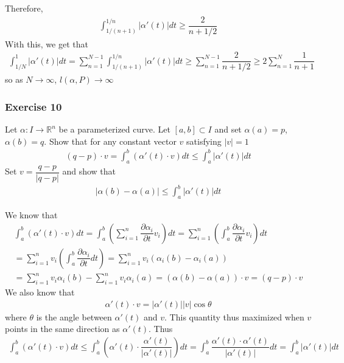 \documentclass{article}
\newcommand{\R}{\mathbb{R}}
\begin{document}
	Therefore,
	\begin{gather*}
		\int_{1/(n + 1)}^{1/n} |\alpha'(t)| dt \geq \dfrac{2}{n + 1/2}
	\end{gather*}
	With this, we get that
	\begin{gather*}
		\int_{1/N}^{1} |\alpha'(t)| dt = \sum_{n = 1}^{N - 1} \int_{1/(n + 1)}^{1/n} |\alpha'(t)| dt \geq \sum_{n = 1}^{N - 1} \dfrac{2}{n + 1/2} \geq 2 \sum_{n = 1}^{N} \dfrac{1}{n + 1}
	\end{gather*}
	so as $N \to \infty$, $l(\alpha, P) \to \infty$
	
	\subsubsection*{Exercise 10}
	Let $\alpha \colon I \to \R^n$ be a parameterized curve. Let $[a, b] \subset I$ and set $\alpha(a) = p$, $\alpha(b) = q$. Show that for any constant vector $v$ satisfying $|v| = 1$
	\begin{gather*}
		(q - p) \cdot v = \int_a^b (\alpha'(t) \cdot v) dt \leq \int_a^b |\alpha'(t)| dt
	\end{gather*}
	Set $v = \dfrac{q - p}{|q - p|}$ and show that
	\begin{gather*}
		|\alpha(b) - \alpha(a)| \leq \int_a^b |\alpha'(t)| dt
	\end{gather*}
	
	We know that
	\begin{gather*}
		\int_a^b ( \alpha'(t) \cdot v ) dt = \int_a^b \left( \sum_{i = 1}^{n} \dfrac{\partial \alpha_i}{\partial t} v_i \right) dt = \sum_{i = 1}^{n} \left( \int_a^b \dfrac{\partial \alpha_i}{\partial t} v_i \right) dt \\
		= \sum_{i = 1}^{n} v_i \left( \int_a^b \dfrac{\partial \alpha_i}{\partial t} dt \right) = \sum_{i = 1}^{n} v_i \left( \alpha_i(b) - \alpha_i(a) \right) \\
		= \sum_{i = 1}^{n} v_i \alpha_i(b) - \sum_{i = 1}^{n} v_i \alpha_i(a) = \left( \alpha(b) - \alpha(a) \right) \cdot v = (q - p) \cdot v
	\end{gather*}
	We also know that
	\begin{gather*}
		\alpha'(t) \cdot v = |\alpha'(t)| |v| \cos \theta
	\end{gather*}
	where $\theta$ is the angle between $\alpha'(t)$ and $v$. This quantity thus maximized when $v$ points in the same direction as $\alpha'(t)$. Thus
	\begin{gather*}
		\int_a^b \left( \alpha'(t) \cdot v \right) dt \leq \int_a^b \left( \alpha'(t) \cdot \dfrac{\alpha'(t)}{|\alpha'(t)|} \right) dt = \int_a^b \dfrac{\alpha'(t) \cdot \alpha'(t)}{|\alpha'(t)|} dt = \int_a^b |\alpha'(t)| dt
	\end{gather*}
	
\end{document}
